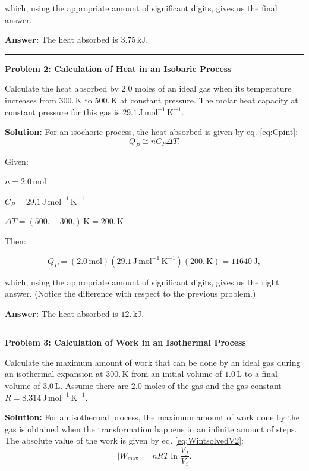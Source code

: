 \documentclass[
  9pt,
]{extbook}
\theoremstyle{definition}
\theoremstyle{definition}
\theoremstyle{definition}
\theoremstyle{remark}
\begin{document}
which, using the appropriate amount of significant digits, gives us the final answer.

\textbf{Answer:} The heat absorbed is \(3.75\,\text{kJ}.\)

\begin{center}\rule{0.5\linewidth}{0.5pt}\end{center}

\textbf{Problem 2: Calculation of Heat in an Isobaric Process}

Calculate the heat absorbed by 2.0 moles of an ideal gas when its temperature increases from \(300. \,\text{K}\) to \(500. \,\text{K}\) at constant pressure. The molar heat capacity at constant pressure for this gas is \(29.1 \, \text{J} \, \text{mol}^{-1} \, \text{K}^{-1}\).

\textbf{Solution:} For an isochoric process, the heat absorbed is given by eq. \eqref{eq:Cpint}: \[  Q_P \cong n C_P \Delta T.\]

Given:

\(n=2.0\,\text{mol}\)

\(C_P =29.1 \, \text{J} \, \text{mol}^{-1} \, \text{K}^{-1}\)

\(\Delta T= (500.-300.)\,\text{K}=200.\,\text{K}\)

Then:

\[Q_P=(2.0\,\text{mol})(29.1\,\text{J} \, \text{mol}^{-1} \, \text{K}^{-1})(200.\,\text{K}) = 11640\,\text{J},\]

which, using the appropriate amount of significant digits, gives us the right answer. (Notice the difference with respect to the previous problem.)

\textbf{Answer:} The heat absorbed is \(12.\, \text{kJ}.\)

\begin{center}\rule{0.5\linewidth}{0.5pt}\end{center}

\textbf{Problem 3: Calculation of Work in an Isothermal Process}

Calculate the maximum amount of work that can be done by an ideal gas during an isothermal expansion at \(300.\, \text{K}\) from an initial volume of \(1.0\,\text{L}\) to a final volume of \(3.0\,\text{L}\). Assume there are 2.0 moles of the gas and the gas constant \(R=8.314\, \text{J} \, \text{mol}^{-1} \, \text{K}^{-1}\).

\textbf{Solution:} For an isothermal process, the maximum amount of work done by the gas is obtained when the transformation happens in an infinite amount of steps. The absolute value of the work is given by eq. \eqref{eq:WintsolvedV2}: \[  \left| W_{\text{max}} \right| = nRT \ln \frac{V_f}{V_i}.\]
\end{document}
